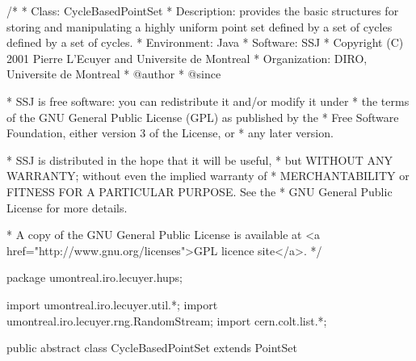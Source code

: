 \begin{code}
\begin{hide}
/*
 * Class:        CycleBasedPointSet
 * Description:  provides the basic structures for storing and manipulating
                 a highly uniform point set defined by a set of cycles
 defined by a set of cycles.
 * Environment:  Java
 * Software:     SSJ 
 * Copyright (C) 2001  Pierre L'Ecuyer and Universite de Montreal
 * Organization: DIRO, Universite de Montreal
 * @author       
 * @since

 * SSJ is free software: you can redistribute it and/or modify it under
 * the terms of the GNU General Public License (GPL) as published by the
 * Free Software Foundation, either version 3 of the License, or
 * any later version.

 * SSJ is distributed in the hope that it will be useful,
 * but WITHOUT ANY WARRANTY; without even the implied warranty of
 * MERCHANTABILITY or FITNESS FOR A PARTICULAR PURPOSE.  See the
 * GNU General Public License for more details.

 * A copy of the GNU General Public License is available at
   <a href="http://www.gnu.org/licenses">GPL licence site</a>.
 */
\end{hide}
package umontreal.iro.lecuyer.hups;\begin{hide}

import umontreal.iro.lecuyer.util.*;
import umontreal.iro.lecuyer.rng.RandomStream;
import cern.colt.list.*;
\end{hide}

public abstract class CycleBasedPointSet extends PointSet \begin{hide} {

   protected int numCycles = 0;     // Total number of cycles.
   // dim = Integer.MAX_VALUE;      // Dimension is infinite.
   private double[] shift;          // Random shift, initially null.
                                    // Entry j is for dimension j.
   protected ObjectArrayList cycles = new ObjectArrayList(); // List of cycles.

\end{hide}
\end{code}


